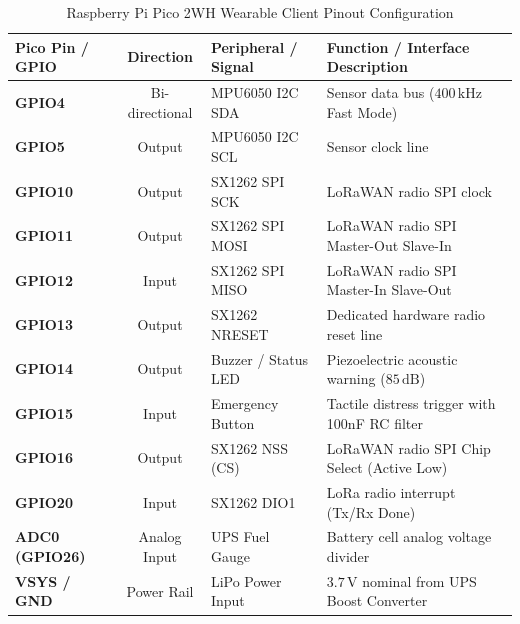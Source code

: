 \begin{table}[htbp]
    \centering
    \caption{Raspberry Pi Pico 2WH Wearable Client Pinout Configuration}
    \label{tab:pico_pinout}
    \begin{tabularx}{\textwidth}{l c l X}
        \toprule
        \textbf{Pico Pin / GPIO} & \textbf{Direction} & \textbf{Peripheral / Signal} & \textbf{Function / Interface Description} \\
        \midrule
        \textbf{GPIO4} & Bi-directional & MPU6050 I2C SDA & Sensor data bus ($400\,\text{kHz}$ Fast Mode) \\
        \textbf{GPIO5} & Output & MPU6050 I2C SCL & Sensor clock line \\
        \textbf{GPIO10} & Output & SX1262 SPI SCK & LoRaWAN radio SPI clock \\
        \textbf{GPIO11} & Output & SX1262 SPI MOSI & LoRaWAN radio SPI Master-Out Slave-In \\
        \textbf{GPIO12} & Input & SX1262 SPI MISO & LoRaWAN radio SPI Master-In Slave-Out \\
        \textbf{GPIO13} & Output & SX1262 NRESET & Dedicated hardware radio reset line \\
        \textbf{GPIO14} & Output & Buzzer / Status LED & Piezoelectric acoustic warning ($85\,\text{dB}$) \\
        \textbf{GPIO15} & Input & Emergency Button & Tactile distress trigger with 100nF RC filter \\
        \textbf{GPIO16} & Output & SX1262 NSS (CS) & LoRaWAN radio SPI Chip Select (Active Low) \\
        \textbf{GPIO20} & Input & SX1262 DIO1 & LoRa radio interrupt (Tx/Rx Done) \\
        \textbf{ADC0 (GPIO26)} & Analog Input & UPS Fuel Gauge & Battery cell analog voltage divider \\
        \textbf{VSYS / GND} & Power Rail & LiPo Power Input & $3.7\,\text{V}$ nominal from UPS Boost Converter \\
        \bottomrule
    \end{tabularx}
\end{table}

